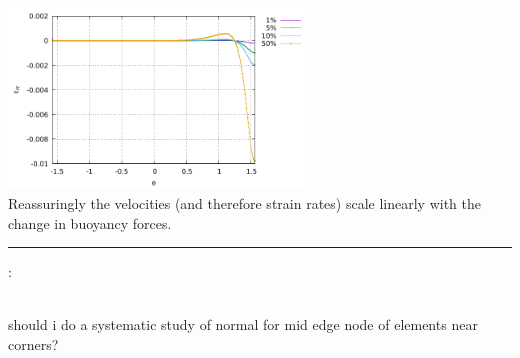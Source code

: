 \begin{center}
\includegraphics[width=8cm]{python_codes/fieldstone_152/results/exp3_axisymmetric/err_R2}\\
{\captionfont Reassuringly the velocities (and therefore strain rates) scale linearly with the 
change in buoyancy forces.}
\end{center}

\newpage
\par\noindent\rule{\textwidth}{0.4pt}


\vspace{.5cm}

\noindent\Literature:\\
\\

should i do a systematic study of normal for mid edge node of elements near corners?



